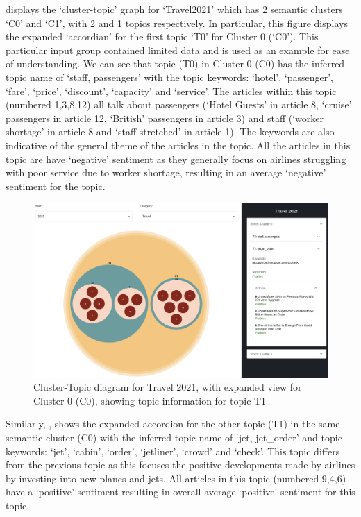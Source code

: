  displays the `cluster-topic' graph for `Travel2021' which has 2 semantic clusters `C0' and `C1', with 2 and 1 topics respectively. In particular, this figure displays the expanded `accordian' for the first topic `T0' for Cluster 0 (`C0'). This particular input group contained limited data and is used as an example for ease of understanding. We can see that topic (T0) in Cluster 0 (C0) has the inferred topic name of `staff, passengers' with the topic keywords: `hotel', `passenger', `fare', `price', `discount', `capacity' and `service'. The articles within this topic (numbered 1,3,8,12) all talk about passengers (`Hotel Guests' in article 8, `cruise' passengers in article 12, `British' passengers in article 3) and staff (`worker shortage' in article 8 and `staff stretched' in article 1). The keywords are also indicative of the general theme of the articles in the topic. All the articles in this topic are have `negative' sentiment as they generally focus on airlines struggling with poor service due to worker shortage, resulting in an average `negative' sentiment for the topic.

\begin{figure}[H]
  \centering
  \includegraphics[width=0.99\linewidth]{images/travel2021_topics_1b.png}
  \caption{Cluster-Topic diagram for Travel 2021, with expanded view for Cluster 0 (C0), showing topic information for topic T1}
  \label{fig:topics1b_travel2021}
\end{figure}

Similarly, , shows the expanded accordion for the other topic (T1) in the same semantic cluster (C0) with the inferred topic name of `jet, jet\_order' and topic keywords: `jet', `cabin', `order', `jetliner', `crowd' and `check'. This topic differs from the previous topic as this focuses the positive developments made by airlines by investing into new planes and jets. All articles in this topic (numbered 9,4,6) have a `positive' sentiment resulting in overall average `positive' sentiment for this topic.

